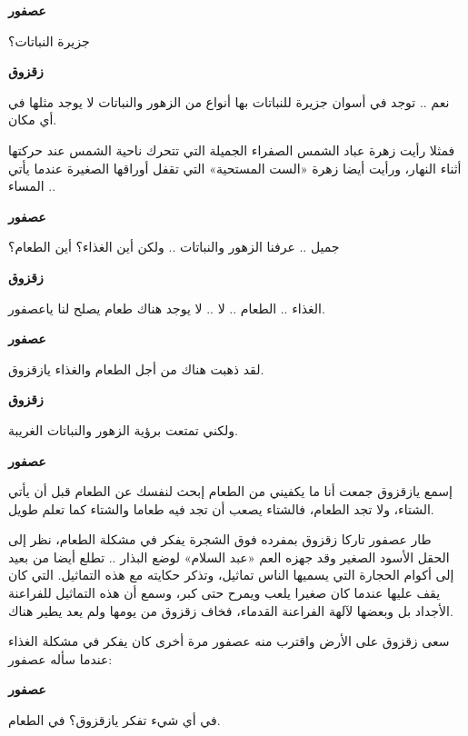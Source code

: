 \documentclass[12pt]{article}
\newlength{\SpeakerGutter}
\newlength{\DialogueGap}
\newlength{\StoryBodyWidth}
\newcommand{\Narration}[1]{%
  \par
  \noindent
  \begin{minipage}[t]{\StoryBodyWidth}
    \RaggedLeft
    #1
  \end{minipage}
  \par
}
\newcommand{\DialogueLine}[2]{%
  \par\addvspace{0.75\baselineskip}
  \noindent
  \begin{minipage}[t]{\SpeakerGutter}
    \RaggedLeft
    \bfseries #1
  \end{minipage}%
  \hspace{\DialogueGap}%
  \begin{minipage}[t]{\StoryBodyWidth}
    \RaggedLeft
    #2
  \end{minipage}%
  \par
}
\newcommand{\TextOnlyPage}[1]{%
  \clearpage
  \thispagestyle{empty}
  \vspace*{2mm}
  #1
  \clearpage
}
\begin{document}
\TextOnlyPage{%
  \DialogueLine{عصفور}{جزيرة النباتات؟}
  \DialogueLine{زقزوق}{نعم .. توجد في أسوان جزيرة للنباتات بها أنواع من الزهور والنباتات لا يوجد مثلها في أي مكان.}
  \Narration{فمثلا رأيت زهرة عباد الشمس الصفراء الجميلة التي تتحرك ناحية الشمس عند حركتها أثناء النهار، ورأيت أيضا زهرة «الست المستحية» التي تقفل أوراقها الصغيرة عندما يأتي المساء ..}
  \DialogueLine{عصفور}{جميل .. عرفنا الزهور والنباتات .. ولكن أين الغذاء؟ أين الطعام؟}
  \DialogueLine{زقزوق}{الغذاء .. الطعام .. لا .. لا يوجد هناك طعام يصلح لنا ياعصفور.}
  \DialogueLine{عصفور}{لقد ذهبت هناك من أجل الطعام والغذاء يازقزوق.}
  \DialogueLine{زقزوق}{ولكني تمتعت برؤية الزهور والنباتات الغريبة.}
  \DialogueLine{عصفور}{إسمع يازقزوق جمعت أنا ما يكفيني من الطعام إبحث لنفسك عن الطعام قبل أن يأتي الشتاء، ولا تجد الطعام، فالشتاء يصعب أن تجد فيه طعاما والشتاء كما تعلم طويل.}
  \Narration{طار عصفور تاركا زقزوق بمفرده فوق الشجرة يفكر في مشكلة الطعام، نظر إلى الحقل الأسود الصغير وقد جهزه العم «عبد السلام» لوضع البذار .. تطلع أيضا من بعيد إلى أكوام الحجارة التي يسميها الناس تماثيل، وتذكر حكايته مع هذه التماثيل. التي كان يقف عليها عندما كان صغيرا يلعب ويمرح حتى كبر، وسمع أن هذه التماثيل للفراعنة الأجداد بل وبعضها لآلهة الفراعنة القدماء، فخاف زقزوق من يومها ولم يعد يطير هناك.}
  \Narration{سعى زقزوق على الأرض واقترب منه عصفور مرة أخرى كان يفكر في مشكلة الغذاء عندما سأله عصفور:}
  \DialogueLine{عصفور}{في أي شيء تفكر يازقزوق؟ في الطعام.}
}
\end{document}
